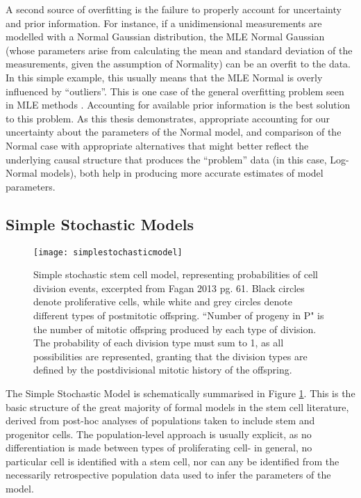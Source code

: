 A second source of overfitting is the failure to properly account for uncertainty and prior information. For instance, if a unidimensional measurements are modelled with a Normal Gaussian distribution, the MLE Normal Gaussian (whose parameters arise from calculating the mean and standard deviation of the measurements, given the assumption of Normality) can be an overfit to the data. In this simple example, this usually means that the MLE Normal is overly influenced by ``outliers''. This is one case of the general overfitting problem seen in MLE methods \cite{Green2017}. Accounting for available prior information is the best solution to this problem. As this thesis demonstrates, appropriate accounting for our uncertainty about the parameters of the Normal model, and comparison of the Normal case with appropriate alternatives that might better reflect the underlying causal structure that produces the ``problem'' data (in this case, Log-Normal models), both help in producing more accurate estimates of model parameters.
 
\subsection{Simple Stochastic Models}
\label{ssec:SSM}

\begin{figure}
\texttt{[image: simplestochasticmodel]}
\centering
\caption{Simple stochastic stem cell model, representing probabilities of cell division events, excerpted from Fagan 2013 pg. 61. Black circles denote proliferative cells, while white and grey circles denote different types of postmitotic offspring. ``Number of progeny in P" is the number of mitotic offspring produced by each type of division. The probability of each division type must sum to 1, as all possibilities are represented, granting that the division types are defined by the postdivisional mitotic history of the offspring.}
\label{fig:SSM}
\end{figure}

The Simple Stochastic Model is schematically summarised in Figure \ref{fig:SSM}. This is the basic structure of the great majority of formal models in the stem cell literature, derived from post-hoc analyses of populations taken to include stem and progenitor cells. The population-level approach is usually explicit, as no differentiation is made between types of proliferating cell- in general, no particular cell is identified with a stem cell, nor can any be identified from the necessarily retrospective population data used to infer the parameters of the model. 

